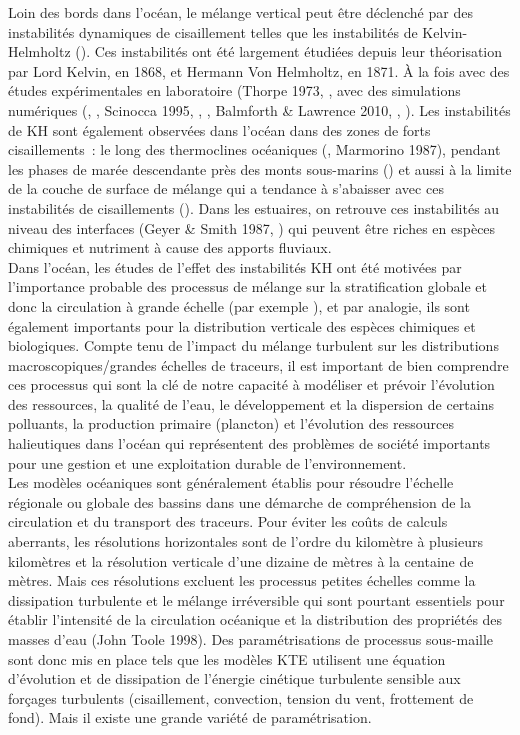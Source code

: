 \documentclass[a4paper,12pt]{article}
\begin{document}
    Loin des bords dans l'océan, le mélange vertical peut être déclenché par des instabilités dynamiques de cisaillement telles que les instabilités de Kelvin-Helmholtz (\cite{smyth_ocean_2012}). Ces instabilités ont été largement étudiées depuis leur théorisation par Lord Kelvin, en 1868, et Hermann Von Helmholtz, en 1871. À la fois avec des études expérimentales en laboratoire (Thorpe 1973, \citet{caulfield_secondary_1996,patterson_time-dependent_2006}, avec des simulations numériques (\cite{klaassen_role_1989}, \cite{caulfield_three_1994}, Scinocca 1995, \cite{alexakis_stratified_2009}, \cite{carpenter_identifying_2010}, Balmforth & Lawrence 2010, \cite{mashayek_shear-induced_2013}, \cite{mashayek_zoo_2012}). Les instabilités de KH sont également observées dans l'océan dans des zones de forts cisaillements : le long des thermoclines océaniques (\cite{woods_wave-induced_1968}, Marmorino 1987), pendant les phases de marée descendante près des monts sous-marins (\cite{van_haren_deep-ocean_2010}) et aussi à la limite de la couche de surface de mélange qui a tendance à s'abaisser avec ces instabilités de cisaillements (\cite{lincoln_surface_2016}). Dans les estuaires, on retrouve ces instabilités au niveau des interfaces (Geyer & Smith 1987,  \cite{geyer_mixing_2010}) qui peuvent être riches en espèces chimiques et nutriment à cause des apports fluviaux. 
    \\
    Dans l'océan, les études de l'effet des instabilités KH ont été motivées par l'importance probable des processus de mélange sur la stratification globale et donc la circulation à grande échelle (par exemple \cite{wunsch_v_2004}), et par analogie, ils sont également importants pour la distribution verticale des espèces chimiques et biologiques. Compte tenu de l'impact du mélange turbulent sur les distributions macroscopiques/grandes échelles de traceurs, il est important de bien comprendre ces processus qui sont la clé de notre capacité à modéliser et prévoir l’évolution des ressources, la qualité de l'eau, le développement et la dispersion de certains polluants, la production primaire (plancton) et l’évolution des ressources halieutiques dans l'océan qui représentent des problèmes de société importants pour une gestion et une exploitation durable de l’environnement. 
    \\
    Les modèles océaniques sont généralement établis pour résoudre l'échelle régionale ou globale des bassins dans une démarche de compréhension de la circulation et du transport des traceurs. Pour éviter les coûts de calculs aberrants, les résolutions horizontales sont de l'ordre du kilomètre à plusieurs kilomètres et la résolution verticale d'une dizaine de mètres à la centaine de mètres. Mais ces résolutions excluent les processus petites échelles comme la dissipation turbulente et le mélange irréversible qui sont pourtant essentiels pour établir l'intensité de la circulation océanique et la distribution des propriétés des masses d'eau (John Toole 1998). Des paramétrisations de processus sous-maille sont donc mis en place tels que les modèles KTE utilisent une équation d'évolution et de dissipation de l'énergie cinétique turbulente sensible aux forçages turbulents (cisaillement, convection, tension du vent, frottement de fond). Mais il existe une grande variété de paramétrisation.\\
\end{document}
